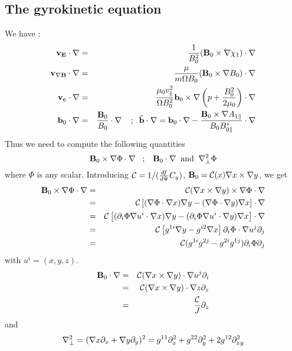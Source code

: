 \subsection{The gyrokinetic equation} 
We have :
\begin{eqnarray}
\mathbf{v_E} \cdot \nabla &=& \frac{1}{B_0 ^2} (\mathbf{B}_0 \times \nabla \chi _1) \cdot \nabla \\
\mathbf{v_{\nabla B}} \cdot \nabla &=& \frac{\mu}{m \Omega B_0}(\mathbf{B}_0 \times \nabla B_0) \cdot \nabla \\
\mathbf{v_c} \cdot \nabla &=& \frac{\mu_0 v_\parallel ^2}{\Omega B_0^2}\mathbf{b}_0 \times \nabla \left (p+\frac{B_0^2}{2 \mu_0} \right) \cdot \nabla \\
\mathbf{b} _0 \cdot \nabla &=& \frac{\mathbf{B}_0}{B_0} \cdot \nabla \; \; \; \; ; \; \; \tilde{\mathbf{b}} \cdot \nabla = \mathbf{b} _0 \cdot \nabla  - \frac{\mathbf{B} _0 \times \nabla A_{1 \parallel}}{B_0 B_{0 \parallel} ^*} \cdot \nabla 
\end{eqnarray}
Thus we need to compute the following quantities
\[
\mathbf{B}_0 \times \nabla \Phi \cdot \nabla \; \; \; ; \; \; \; \mathbf{B}_0 \cdot \nabla \; \; \mbox{and} \; \; \nabla _\perp ^2 \Phi
\]
where $\Phi$ is any scalar. Introducing $\mathcal{C}=1/(\frac{d f}{d \Psi} C_y)$, $\mathbf{B}_0=\mathcal{C}(x) \nabla x \times \nabla y$, we get
\begin{eqnarray*}
\mathbf{B}_0 \times \nabla \Phi \cdot \nabla &=& \mathcal{C} (\nabla x \times \nabla y) \times \nabla \Phi \cdot \nabla \\
&=&\mathcal{C} \left [ (\nabla \Phi \cdot \nabla x) \nabla y - ( \nabla \Phi \cdot \nabla y ) \nabla x \right ] \cdot \nabla\\
&=&\mathcal{C} \left [ (\partial _i \Phi \nabla u^i \cdot \nabla x ) \nabla y - (\partial _i \Phi \nabla u^i \cdot \nabla y ) \nabla x \right ] \cdot \nabla \\
&=&\mathcal{C} \left [ g^{1i}\nabla y - g^{i2}\nabla x \right ] \partial _i \Phi \cdot \nabla u^j \partial _j \\
&=&\mathcal{C} ( g^{1i} g^{2j}-g^{2i}g^{1j})\partial _i \Phi \partial_j
\end{eqnarray*}
with $u^i=(x,y,z)$. 
\begin{eqnarray*}
\mathbf{B}_0 \cdot \nabla &=& \mathcal{C} (\nabla x \times \nabla y) \cdot \nabla u^j \partial _i \\
                      &=&\mathcal{C}  (\nabla x \times \nabla y) \cdot \nabla z \partial _z \\
                      &=& \frac{\mathcal{C}}{J} \partial _z
\end{eqnarray*}
and 
\begin{eqnarray*}
\nabla _\perp ^2 = (\nabla x \partial _x + \nabla y \partial _y)^2 = g^{11}\partial _x ^2 + g^{22} \partial _y ^2 + 2 g^{12} \partial ^2 _{x y} 
\end{eqnarray*}

